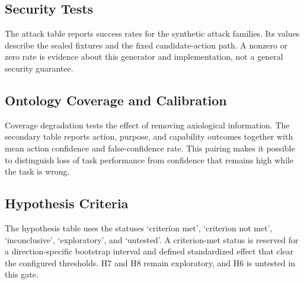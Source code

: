 
\subsection{Security Tests}

The attack table reports success rates for the synthetic attack families. Its values describe the sealed fixtures and the fixed candidate-action path. A nonzero or zero rate is evidence about this generator and implementation, not a general security guarantee.


\subsection{Ontology Coverage and Calibration}

Coverage degradation tests the effect of removing axiological information. The secondary table reports action, purpose, and capability outcomes together with mean action confidence and false-confidence rate. This pairing makes it possible to distinguish loss of task performance from confidence that remains high while the task is wrong.


\subsection{Hypothesis Criteria}

The hypothesis table uses the statuses `criterion met', `criterion not met', `inconclusive', `exploratory', and `untested'. A criterion-met status is reserved for a direction-specific bootstrap interval and defined standardized effect that clear the configured thresholds. H7 and H8 remain exploratory, and H6 is untested in this gate.

